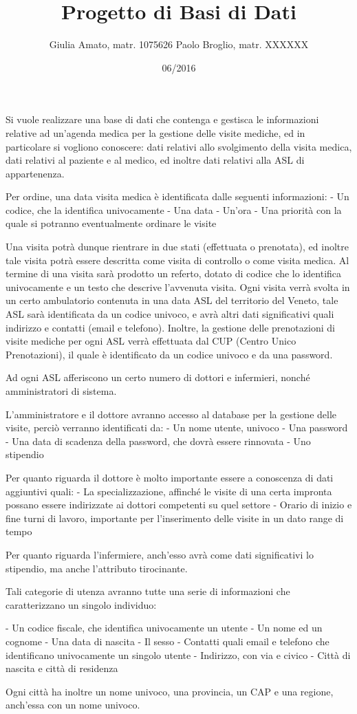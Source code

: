 

\title{Progetto di Basi di Dati}
\author{Giulia Amato, matr. 1075626  Paolo Broglio, matr. XXXXXX}
\date{06/2016}


\begin{Descrizione dei requisiti}
Si vuole realizzare una base di dati che contenga e gestisca le informazioni relative ad un'agenda medica per la gestione delle visite mediche, ed in particolare si vogliono conoscere: dati relativi allo svolgimento della visita medica, dati relativi al paziente e al medico, ed inoltre dati relativi alla ASL di appartenenza. 

Per ordine, una data visita medica è identificata dalle seguenti informazioni:
- Un codice, che la identifica univocamente
- Una data
- Un'ora
- Una priorità con la quale si potranno eventualmente ordinare le visite

Una visita potrà dunque rientrare in due stati (effettuata o prenotata), ed inoltre tale visita potrà essere descritta come visita di controllo o come visita medica.
Al termine di una visita sarà prodotto un referto, dotato di codice che lo identifica univocamente e un testo che descrive l'avvenuta visita. 
Ogni visita verrà svolta in un certo ambulatorio contenuta in una data ASL del territorio del Veneto, tale ASL sarà identificata da un codice univoco, e avrà altri dati significativi quali indirizzo e contatti (email e telefono). Inoltre, la gestione delle prenotazioni di visite mediche per ogni ASL verrà effettuata dal CUP (Centro Unico Prenotazioni), il quale è identificato da un codice univoco e da una password.

Ad ogni ASL afferiscono un certo numero di dottori e infermieri, nonché amministratori di sistema.

L'amministratore e il dottore avranno accesso al database per la gestione delle visite, perciò verranno identificati da:
- Un nome utente, univoco
- Una password
- Una data di scadenza della password, che dovrà essere rinnovata 
- Uno stipendio

Per quanto riguarda il dottore è molto importante essere a conoscenza di dati aggiuntivi quali:
- La specializzazione, affinché le visite di una certa impronta possano essere indirizzate ai dottori competenti su quel settore
- Orario di inizio e fine turni di lavoro, importante per l'inserimento delle visite in un dato range di tempo

Per quanto riguarda l'infermiere, anch'esso avrà come dati significativi lo stipendio, ma anche l'attributo tirocinante.

Tali categorie di utenza avranno tutte una serie di informazioni che caratterizzano un singolo individuo:

- Un codice fiscale, che identifica univocamente un utente
- Un nome ed un cognome
- Una data di nascita
- Il sesso
- Contatti quali email e telefono che identificano univocamente un singolo utente
- Indirizzo, con via e civico
- Città di nascita e città di residenza

Ogni città ha inoltre un nome univoco, una provincia, un CAP e una regione, anch'essa con un nome univoco. 

\end{Descrizione dei requisiti}